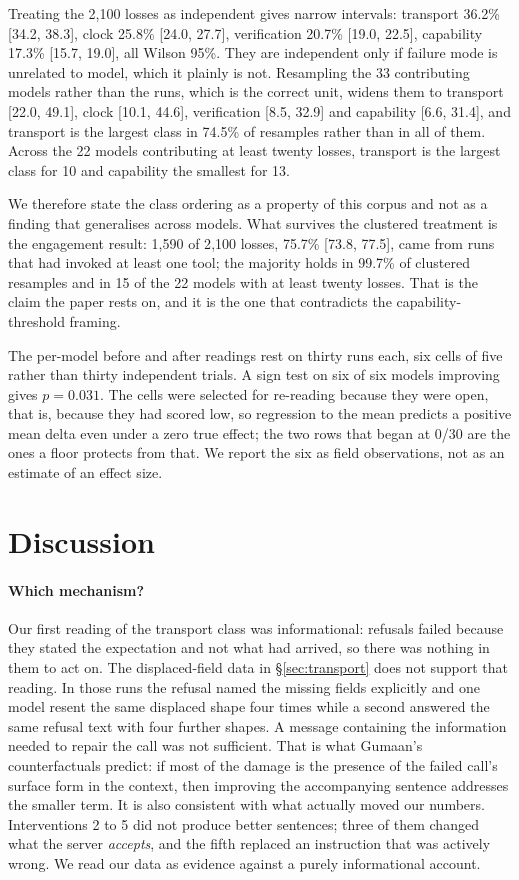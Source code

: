 \documentclass[11pt]{article}
\begin{document}
Treating the 2{,}100 losses as independent gives narrow intervals: transport 36.2\% [34.2, 38.3], clock 25.8\%
[24.0, 27.7], verification 20.7\% [19.0, 22.5], capability 17.3\% [15.7, 19.0], all Wilson 95\%. They are
independent only if failure mode is unrelated to model, which it plainly is not. Resampling the 33 contributing
models rather than the runs, which is the correct unit, widens them to transport [22.0, 49.1], clock [10.1,
44.6], verification [8.5, 32.9] and capability [6.6, 31.4], and transport is the largest class in 74.5\% of
resamples rather than in all of them. Across the 22 models contributing at least twenty losses, transport is the
largest class for 10 and capability the smallest for 13.

We therefore state the class ordering as a property of this corpus and not as a finding that generalises across
models. What survives the clustered treatment is the engagement result: 1{,}590 of 2{,}100 losses, 75.7\% [73.8,
77.5], came from runs that had invoked at least one tool; the majority holds in 99.7\% of clustered resamples and
in 15 of the 22 models with at least twenty losses. That is the claim the paper rests on, and it is the one that
contradicts the capability-threshold framing.

The per-model before and after readings rest on thirty runs each, six cells of five rather than thirty
independent trials. A sign test on six of six models improving gives $p = 0.031$. The cells were selected for
re-reading because they were open, that is, because they had scored low, so regression to the mean predicts a
positive mean delta even under a zero true effect; the two rows that began at 0/30 are the ones a floor protects
from that. We report the six as field observations, not as an estimate of an effect size.

\section{Discussion}

\paragraph{Which mechanism?}
Our first reading of the transport class was informational: refusals failed because they stated the expectation
and not what had arrived, so there was nothing in them to act on. The displaced-field data in
\S\ref{sec:transport} does not support that reading. In those runs the refusal named the missing fields
explicitly and one model resent the same displaced shape four times while a second answered the same refusal text
with four further shapes. A message containing the information needed
to repair the call was not sufficient. That is what Gumaan's counterfactuals predict: if most of the damage is
the presence of the failed call's surface form in the context, then improving the accompanying sentence addresses
the smaller term. It is also consistent with what actually moved our numbers. Interventions 2 to 5 did not
produce better sentences; three of them changed what the server \emph{accepts}, and the fifth replaced an
instruction that was actively wrong. We read our data as evidence against a purely informational account.
\end{document}
